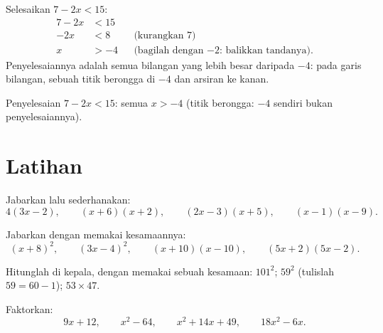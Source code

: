 \begin{example}\label{ex:g9:algebra:ineq}
Selesaikan $7 - 2x < 15$:
\begin{align*}
7 - 2x &< 15 \\
-2x &< 8 && \text{(kurangkan 7)} \\
x &> -4 && \text{(bagilah dengan $-2$: balikkan tandanya).}
\end{align*}
Penyelesaiannya adalah semua bilangan yang lebih besar daripada $-4$:
pada garis bilangan, sebuah titik berongga di $-4$ dan arsiran ke kanan.
\end{example}

\begin{omfigure}

{\small Penyelesaian $7 - 2x < 15$: semua $x > -4$ (titik berongga:
$-4$ sendiri bukan penyelesaiannya).}
\end{omfigure}

\section{Latihan}

\begin{exercise}[$\star$]\label{exo:g9:algebra:1}
Jabarkan lalu sederhanakan:
\[
4(3x - 2), \qquad
(x + 6)(x + 2), \qquad
(2x - 3)(x + 5), \qquad
(x - 1)(x - 9).
\]
\end{exercise}

\begin{exercise}[$\star$]\label{exo:g9:algebra:2}
Jabarkan dengan memakai kesamaannya:
\[
(x + 8)^2, \qquad
(3x - 4)^2, \qquad
(x + 10)(x - 10), \qquad
(5x + 2)(5x - 2).
\]
\end{exercise}

\begin{exercise}[$\star$]\label{exo:g9:algebra:3}
Hitunglah di kepala, dengan memakai sebuah kesamaan: $101^2$; \quad
$59^2$ (tulislah $59 = 60 - 1$); \quad $53 \times 47$.
\end{exercise}

\begin{exercise}[$\star$]\label{exo:g9:algebra:4}
Faktorkan:
\[
9x + 12, \qquad
x^2 - 64, \qquad
x^2 + 14x + 49, \qquad
18x^2 - 6x .
\]
\end{exercise}

